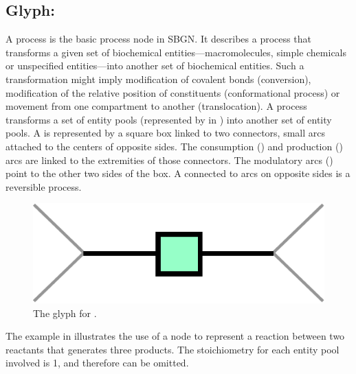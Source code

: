 
\subsection{Glyph: }
\label{sec:process}

A process is the basic process node in SBGN.  It describes a process that transforms a given set of biochemical entities---macromolecules, simple chemicals or unspecified entities---into another set of biochemical entities.  Such a transformation might imply modification of covalent bonds (conversion), modification of the relative position of constituents (conformational process) or movement from one compartment to another (translocation). A process transforms a set of entity pools (represented by  in \SBGNPDLone) into another set of entity pools. A  is represented by a square box linked to two connectors, small arcs attached to the centers of opposite sides. The consumption () and production () arcs are linked to the extremities of those connectors. The modulatory arcs () point to the other two sides of the box. A  connected to  arcs on opposite sides is a reversible process. 

\begin{figure}[H]
  \centering
  \includegraphics[scale = 0.4]{images/process}
  \caption{The \PD glyph for .}
  \label{fig:process}
\end{figure}

The example in  illustrates the use of a  node to represent a reaction between two reactants that generates three products. The stoichiometry for each entity pool involved is 1, and therefore can be omitted.  

